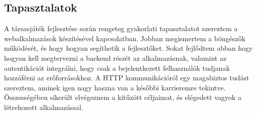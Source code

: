 \documentclass[a4paper,twoside]{article}
\begin{document}
\subsection{Tapasztalatok}
A társasjáték fejlesztése során rengeteg gyakorlati tapasztalatot szereztem a webalkalmazások készítésével kapcsolatban. Jobban megismertem a böngészők működését, és hogy hogyan segíthetik a fejlesztőket. Sokat fejlődtem abban hogy hogyan kell megtervezni a backend részét az alkalmazásnak, valamint az autentikációt integrálni, hogy csak a bejelentkezett felhasználók tudjanak hozzáférni az erőforrásokhoz. A HTTP kommunikációról egy magabiztos tudást szereztem, aminek igen nagy haszna van a későbbi karrieremre tekintve. Összességében sikerült elvégeznem a kitűzött céljaimat, és elégedett vagyok a létrehozott alkalmazással.


\newpage
\end{document}
